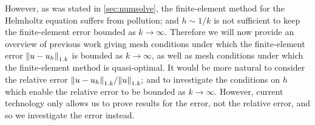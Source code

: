 However, as was stated in \cref{sec:numsolve}, the finite-element method for the Helmholtz equation suffers from pollution; and $h \sim 1/k$ is not sufficient to keep the finite-element error bounded as $k\rightarrow \infty.$ Therefore we will now provide an overview of previous work giving mesh conditions under which the finite-element error $\NW{u-\uh}$ is bounded as $k\rightarrow \infty$, as well as mesh conditions under which the finite-element method is quasi-optimal. It would be more natural to consider the relative error $\NW{u-\uh}/\NW{u};$ and to investigate the conditions on $h$ which enable the relative error to be bounded as $k\rightarrow \infty.$ However, current technology only allows us to prove results for the error, not the relative error, and so we investigate the error instead.







